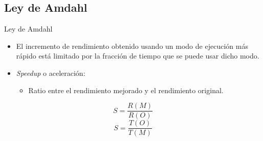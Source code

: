 \subsection{Ley de Amdahl}

\begin{frame}[t]{Ley de Amdahl}
\begin{itemize}
  \item El incremento de rendimiento obtenido usando un modo
        de ejecución más rápido está limitado por la fracción de
        tiempo que se puede usar dicho modo.
  \item \emph{Speedup} o aceleración:
    \begin{itemize}
      \item Ratio entre el rendimiento mejorado y el rendimiento original.
    \end{itemize}
\end{itemize}
\begin{displaymath}
S = \frac{R(M)}{R(O)}
\end{displaymath}
\begin{displaymath}
S = \frac{T(O)}{T(M)}
\end{displaymath}
\end{frame}

